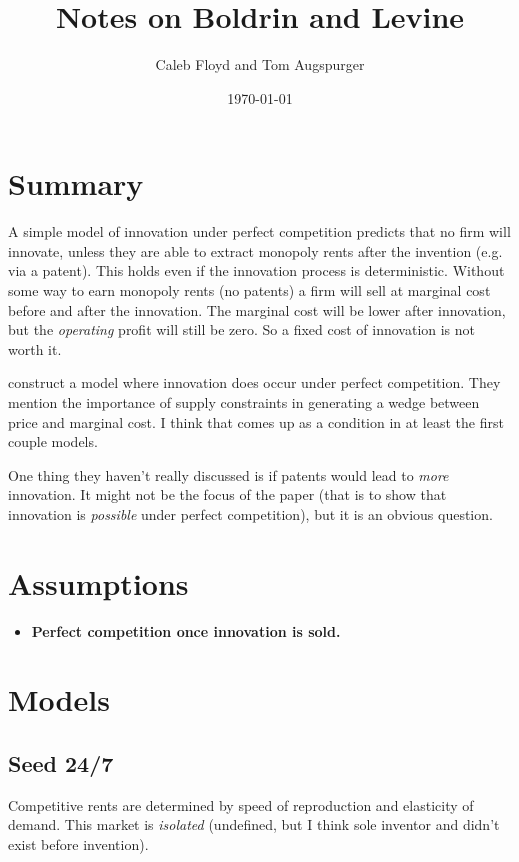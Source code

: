 \documentclass[11pt]{article}
\title{Notes on Boldrin and Levine}
\author{Caleb Floyd and Tom Augspurger}
\date{\today}
\begin{document}
\maketitle

\section{Summary}
\label{sec:summary}
  A simple model of innovation under perfect competition predicts that no firm will innovate, unless they are able to extract monopoly rents after the invention (e.g. via a patent).  This holds even if the innovation process is deterministic.  Without some way to earn monopoly rents (no patents) a firm will sell at marginal cost before and after the innovation.  The marginal cost will be lower after innovation, but the \emph{operating} profit will still be zero.  So a fixed cost of innovation is not worth it. 

  \cite{boldrin_levine:08:pci} construct a model where innovation does occur under perfect competition.  They mention the importance of supply constraints in generating a wedge between price and marginal cost.  I think that comes up as a condition in at least the first couple models.

  One thing they haven't really discussed is if patents would lead to \emph{more} innovation.  It might not be the focus of the paper (that is to show that innovation is \emph{possible} under perfect competition), but it is an obvious question.

\section{Assumptions}
\label{sec:assumptions}
  \begin{itemize}
    \item \textbf{Perfect competition once innovation is sold.}
  \end{itemize}

\section{Models}
\label{sec:models}
 
\subsection{Seed 24/7}
\label{sub:seed_24_7}

  Competitive rents are determined by speed of reproduction and elasticity of demand.  This market is \emph{isolated} (undefined, but I think sole inventor and didn't exist before invention).  
\end{document}
